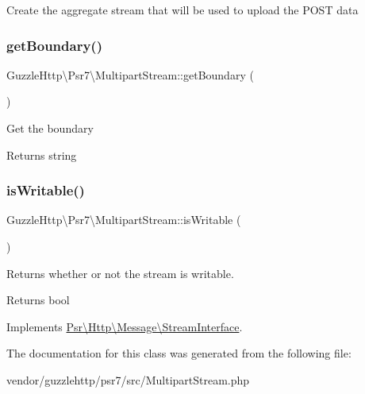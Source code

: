 Create the aggregate stream that will be used to upload the P\+O\+ST data \mbox{\label{classGuzzleHttp_1_1Psr7_1_1MultipartStream_a7efdca423f1aeb7c541b5e01688848b3}} 
\subsubsection{\texorpdfstring{get\+Boundary()}{getBoundary()}}
{\footnotesize\ttfamily Guzzle\+Http\textbackslash{}\+Psr7\textbackslash{}\+Multipart\+Stream\+::get\+Boundary (\begin{DoxyParamCaption}{ }\end{DoxyParamCaption})}

Get the boundary

\begin{DoxyReturn}{Returns}
string 
\end{DoxyReturn}
\mbox{\label{classGuzzleHttp_1_1Psr7_1_1MultipartStream_a7062382f637d4b6b2b953040c916dde9}} 
\subsubsection{\texorpdfstring{is\+Writable()}{isWritable()}}
{\footnotesize\ttfamily Guzzle\+Http\textbackslash{}\+Psr7\textbackslash{}\+Multipart\+Stream\+::is\+Writable (\begin{DoxyParamCaption}{ }\end{DoxyParamCaption})}

Returns whether or not the stream is writable.

\begin{DoxyReturn}{Returns}
bool 
\end{DoxyReturn}


Implements \hyperlink{interfacePsr_1_1Http_1_1Message_1_1StreamInterface_a79287940d75d1951b831879fdc493883}{Psr\textbackslash{}\+Http\textbackslash{}\+Message\textbackslash{}\+Stream\+Interface}.



The documentation for this class was generated from the following file\+:\begin{DoxyCompactItemize}
\item 
vendor/guzzlehttp/psr7/src/Multipart\+Stream.\+php\end{DoxyCompactItemize}
